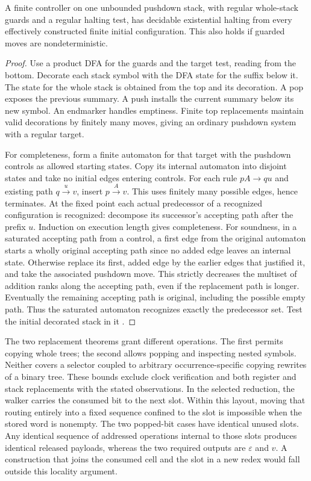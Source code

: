 \begin{prop}\label{stack}
A finite controller on one unbounded pushdown stack, with regular whole-stack guards and a regular halting test, has decidable existential halting from every effectively constructed finite initial configuration. This also holds if guarded moves are nondeterministic.
\end{prop}
\begin{proof}
Use a product DFA for the guards and the target test, reading from the bottom. Decorate each stack symbol with the DFA state for the suffix below it. The state for the whole stack is obtained from the top and its decoration. A pop exposes the previous summary. A push installs the current summary below its new symbol. An endmarker handles emptiness. Finite top replacements maintain valid decorations by finitely many moves, giving an ordinary pushdown system with a regular target.

For completeness, form a finite automaton for that target with the pushdown controls as allowed starting states. Copy its internal automaton into disjoint states and take no initial edges entering controls. For each rule \(pA\to q u\) and existing path \(q\xrightarrow{u}v\), insert \(p\xrightarrow{A}v\). This uses finitely many possible edges, hence terminates. At the fixed point each actual predecessor of a recognized configuration is recognized: decompose its successor's accepting path after the prefix \(u\). Induction on execution length gives completeness. For soundness, in a saturated accepting path from a control, a first edge from the original automaton starts a wholly original accepting path since no added edge leaves an internal state. Otherwise replace its first, added edge by the earlier edges that justified it, and take the associated pushdown move. This strictly decreases the multiset of addition ranks along the accepting path, even if the replacement path is longer. Eventually the remaining accepting path is original, including the possible empty path. Thus the saturated automaton recognizes exactly the predecessor set. Test the initial decorated stack in it \cite{pushdown}.
\end{proof}

The two replacement theorems grant different operations. The first permits copying whole trees; the second allows popping and inspecting nested symbols. Neither covers a selector coupled to arbitrary occurrence-specific copying rewrites of a binary tree. These bounds exclude clock verification and both register and stack replacements with the stated observations. In the selected reduction, the walker carries the consumed bit to the next slot. Within this layout, moving that routing entirely into a fixed sequence confined to the slot is impossible when the stored word is nonempty. The two popped-bit cases have identical unused slots. Any identical sequence of addressed operations internal to those slots produces identical released payloads, whereas the two required outputs are \(\varepsilon\) and \(v\). A construction that joins the consumed cell and the slot in a new redex would fall outside this locality argument.

